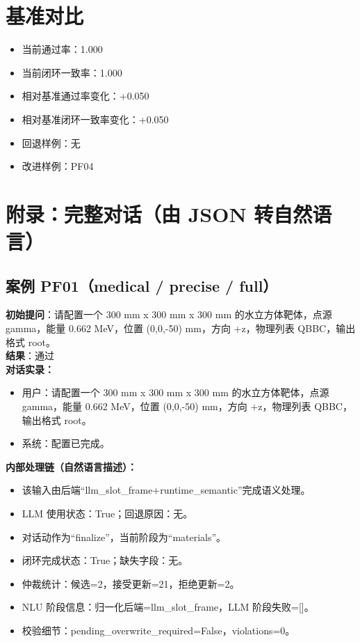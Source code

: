 \documentclass[11pt]{ctexart}
\begin{document}
\section{基准对比}
\begin{itemize}
\item 当前通过率：1.000
\item 当前闭环一致率：1.000
\item 相对基准通过率变化：+0.050
\item 相对基准闭环一致率变化：+0.050
\item 回退样例：无
\item 改进样例：PF04
\end{itemize}
\appendix
\section{附录：完整对话（由 JSON 转自然语言）}
\subsection{案例 PF01（medical / precise / full）}
\textbf{初始提问}：请配置一个 300 mm x 300 mm x 300 mm 的水立方体靶体，点源 gamma，能量 0.662 MeV，位置 (0,0,-50) mm，方向 +z，物理列表 QBBC，输出格式 root。\\
\textbf{结果}：通过\\
\textbf{对话实录：}
\begin{itemize}
\item 用户：请配置一个 300 mm x 300 mm x 300 mm 的水立方体靶体，点源 gamma，能量 0.662 MeV，位置 (0,0,-50) mm，方向 +z，物理列表 QBBC，输出格式 root。
\item 系统：配置已完成。
\end{itemize}
\textbf{内部处理链（自然语言描述）：}
\begin{itemize}
\item 该输入由后端“llm\_slot\_frame+runtime\_semantic”完成语义处理。
\item LLM 使用状态：True；回退原因：无。
\item 对话动作为“finalize”，当前阶段为“materials”。
\item 闭环完成状态：True；缺失字段：无。
\item 仲裁统计：候选=2，接受更新=21，拒绝更新=2。
\item NLU 阶段信息：归一化后端=llm\_slot\_frame，LLM 阶段失败=[]。
\item 校验细节：pending\_overwrite\_required=False，violations=0。
\end{itemize}
\end{document}
